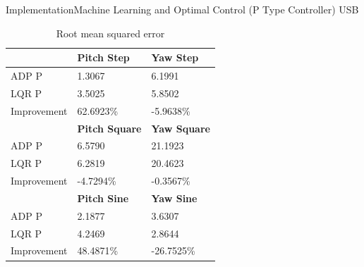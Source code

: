 \documentclass{beamer}
\begin{document}
\begin{frame}{Implementation}{Machine Learning and Optimal Control (P Type Controller) USB}
\begin{table}
    \centering
    \begin{tabular}{l|l|l}
        \toprule
        \textbf{} & \textbf{Pitch Step} & \textbf{Yaw Step}\\
        \toprule
        ADP P & 1.3067 & 6.1991\\
        LQR P & 3.5025 & 5.8502\\
        Improvement & 62.6923\% & -5.9638\% \\
        \toprule
        \textbf{} & \textbf{Pitch Square} & \textbf{Yaw Square}\\
        \toprule
        ADP P & 6.5790 & 21.1923\\
        LQR P & 6.2819 & 20.4623\\
        Improvement & -4.7294\% & -0.3567\% \\
        \toprule
        \textbf{} & \textbf{Pitch Sine} & \textbf{Yaw Sine}\\
        \toprule
        ADP P & 2.1877 & 3.6307\\
        LQR P & 4.2469 & 2.8644\\
        Improvement & 48.4871\% & -26.7525\% \\
    \end{tabular}
    \caption{Root mean squared error}
    \label{tab:RMSE2}
\end{table}
\end{frame}
\end{document}
